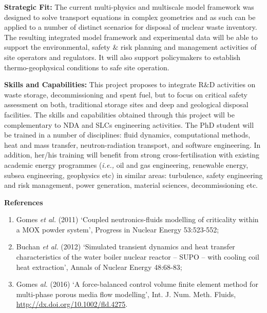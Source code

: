 \documentclass[12pts,a4paper,amsmath,amssymb,floatfix]{article}%
\newcommand{\ie}{{\it i.e., }}
\begin{document}
\begin{enumerate}[label=\bfseries Project: \arabic*:]
{\bf Strategic Fit:} The current multi-physics and multiscale model framework was designed to solve transport equations in complex geometries and as such can be applied to a number of distinct scenarios for disposal of nuclear waste inventory. The resulting integrated model framework and experimental data will be able to support the environmental, safety $\&$ risk planning and management activities of site operators and regulators. It will also support policymakers to establish thermo-geophysical conditions to safe site operation.

{\bf Skills and Capabilities:} This project proposes to integrate R$\&$D activities on waste storage, decommissioning and spent fuel, but to focus on critical safety assessment on both, traditional storage sites and deep and geological disposal facilities. The skills and capabilities obtained through this project will be complementary to NDA and SLCs engineering activities.  The PhD student will be trained in a number of disciplines: fluid dynamics, computational methods, heat and mass transfer, neutron-radiation transport, and software engineering. In addition, her/his training will benefit from strong cross-fertilisation with existing academic energy programmes (\ie oil and gas engineering, renewable energy, subsea engineering, geophysics etc) in similar areas: turbulence, safety engineering and risk management, power generation, material sciences, decommissioning etc.

{\bf References}
\begin{enumerate}
   \item Gomes {\it et al.} (2011) `Coupled neutronics-fluids modelling of criticality within a MOX powder system', Progress in Nuclear Energy 53:523-552;
   \item Buchan {\it et al.} (2012) `Simulated transient dynamics and heat transfer characteristics of the water boiler nuclear reactor – SUPO – with cooling coil heat extraction', Annals of Nuclear Energy 48:68-83;
   \item Gomes {\it al.} (2016) `A force-balanced control volume finite element method for multi-phase porous media flow modelling', Int. J. Num. Meth. Fluids, \href{http://dx.doi.org/10.1002/fld.4275}{http://dx.doi.org/10.1002/fld.4275}.

\end{enumerate}



\end{enumerate}


\end{document}
